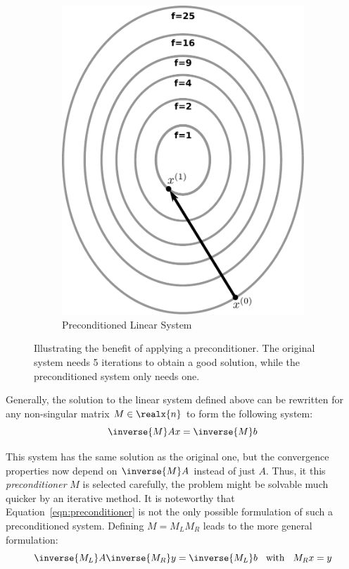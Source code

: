 \begin{figure}
\begin{subfigure}{.5\textwidth}
  \includegraphics[width=1.015\linewidth]{chapters/3_solvers/3_2_iterative_solvers/figures/preconditioner.pdf}
  \caption{Preconditioned Linear System}
  \label{fig:preconditioner}
\end{subfigure}
\caption{Illustrating the benefit of applying a preconditioner. The original system needs 5 iterations to obtain a good solution, while the preconditioned system only needs one.}
\label{fig:preconditioning}
\end{figure}

Generally, the solution to the linear system defined above can be rewritten for any non-singular matrix $M \in \realx{n}$ to form the following system:
\begin{equation}
\label{eqn:preconditioner}
    \inverse
    {M}Ax = \inverse{M}b
\end{equation}

\noindent This system has the same solution as the original one, but the convergence properties now depend on $\inverse{M}A$ instead of just $A$. Thus, it this \textit{preconditioner} $M$ is selected carefully, the problem might be solvable much quicker by an iterative method. It is noteworthy that Equation~\hyperref[eqn:preconditioner]{\ref{eqn:preconditioner}} is not the only possible formulation of such a preconditioned system. Defining $M=M_LM_R$ leads to the more general formulation:
\begin{equation}
    \inverse{M_L}A\inverse{M_R}y = \inverse{M_L}b\;\; \text{ with }\;\; M_Rx=y
\end{equation}

